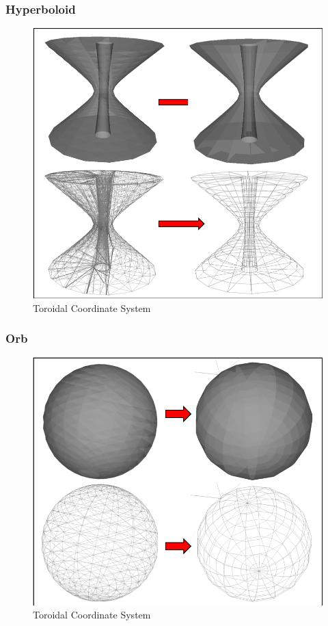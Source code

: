 \documentclass[12pt,a4paper]{article}
\begin{document}
\subsubsection{Hyperboloid}

\begin{figure}[h!]
\centering
\includegraphics[scale=0.5]{Images//Meshes//hyperboloid.png}
\caption[width=\columnwidth]{Toroidal Coordinate System}
\label{conts}
\end{figure}


\subsubsection{Orb}

\begin{figure}[h!]
\centering
\includegraphics[scale=0.5]{Images//Meshes//orb.png}
\caption[width=\columnwidth]{Toroidal Coordinate System}
\label{conts}
\end{figure}
\end{document}

